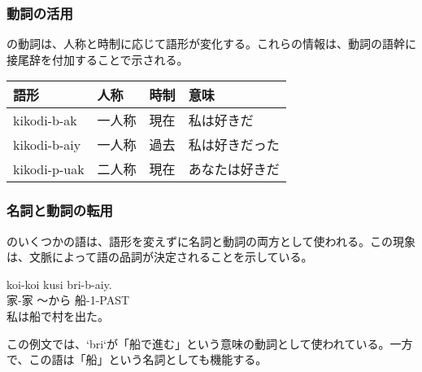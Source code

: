 \subsubsection{動詞の活用}
\langname の動詞は、人称と時制に応じて語形が変化する。これらの情報は、動詞の語幹に接尾辞を付加することで示される。

\begin{tabular}{llll}
    \toprule
    \textbf{語形} & \textbf{人称} & \textbf{時制} & \textbf{意味} \\
    \midrule
    kikodi-b-ak & 一人称 & 現在 & 私は好きだ \\
    kikodi-b-aiy & 一人称 & 過去 & 私は好きだった \\
    kikodi-p-uak & 二人称 & 現在 & あなたは好きだ \\
    \bottomrule
\end{tabular}

\subsubsection{名詞と動詞の転用}
\langname のいくつかの語は、語形を変えずに名詞と動詞の両方として使われる。この現象は、文脈によって語の品詞が決定されることを示している。

\begin{exe}
    \ex \gll koi-koi kusi bri-b-aiy.\\
    家-家 ～から 船-1-PAST \\
    \glt 私は船で村を出た。
\end{exe}
この例文では、`bri`が「船で進む」という意味の動詞として使われている。一方で、この語は「船」という名詞としても機能する。